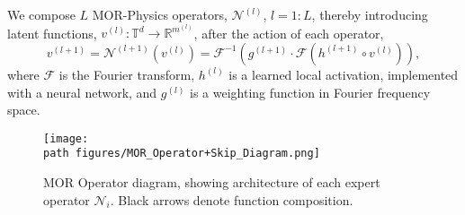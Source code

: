  We compose $L$ MOR-Physics operators, $\mathcal{N}^{(l)}$, $l = 1:L$, thereby introducing latent functions, $v^{(l)}:\mathbb{T}^{d} \rightarrow \mathbb{R}^{m^{(l)}}$, after the action of each operator, 
\begin{equation}
    v^{(l+1)} = \mathcal{N}^{(l+1)}(v^{(l)}) =\mathcal{F}^{-1}(g^{(l+1)}\cdot \mathcal{F}(h^{(l+1)} \circ v^{(l)})),
\label{eq:MOR_layer}
\end{equation}
where $\mathcal{F}$ is the Fourier transform, $h^{(l)}$ is a learned local activation, implemented with a neural network, and $g^{(l)}$ is a weighting function in Fourier frequency space.
\begin{figure*}
    \centering
    \texttt{[image: \\path figures/MOR\_Operator+Skip\_Diagram.png]}
    \caption{MOR Operator diagram, showing architecture of each expert operator $\mathcal{N}_i$. Black arrows denote function composition.}
    \label{fig:MOR_Operator}
\end{figure*}
